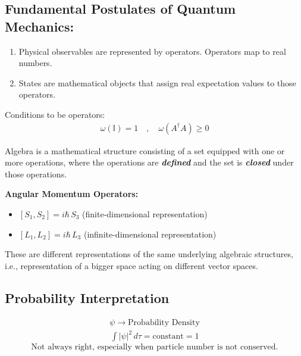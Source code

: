 \documentclass[14pt]{article} %
\begin{document}
\subsection*{Fundamental Postulates of Quantum Mechanics:}
\begin{enumerate}
    \item Physical observables are represented by operators. Operators map to real numbers.
    \item States are mathematical objects that assign real expectation values to those operators.
\end{enumerate}
Conditions to be operators:
\begin{align*}
\omega(\mathbb{I}) = 1 \quad , \quad \omega(A^\dagger A) \geq 0
\end{align*}
\begin{tcolorbox}[ title=\textbf{Question: What is algebra?}]
Algebra is a mathematical structure consisting of a set equipped with one or more operations, where the operations are \textbf{\textit{defined}} and the set is \textbf{\textit{closed}} under those operations.
\end{tcolorbox}
\textbf{Angular Momentum Operators:}
\begin{itemize}
    \item $[S_1, S_2] = i\hbar\, S_3$ \hfill (finite-dimensional representation)
    \item $[L_1, L_2] = i\hbar\, L_3$ \hfill (infinite-dimensional representation)
\end{itemize}
These are different representations of the same underlying algebraic structures, i.e., representation of a bigger space acting on different vector spaces.
\subsection*{Probability Interpretation}
\begin{align*}
\psi \rightarrow \text{Probability Density}
\end{align*}
\begin{align*}
    \int |\psi|^2 \, d\tau = \text{constant} =1
\end{align*}
$$\text{Not always right, especially when particle number is not conserved.}$$
\end{document}
